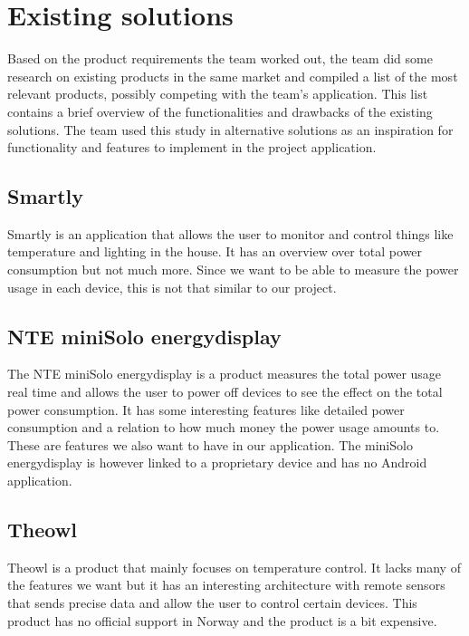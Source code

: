 \section{Existing solutions}

Based on the product requirements the team worked out, the team did some research on existing products in the 
same market and compiled a list of the most relevant products, possibly competing with the team's application. 
This list contains a brief overview of the functionalities and drawbacks of the existing solutions. 
The team used this study in alternative solutions as an inspiration for functionality and features to implement 
in the project application.

\subsection{Smartly}

Smartly\cite{smartly} is an application that allows the user to monitor and control things like 
temperature and lighting in the house. It has an overview over total power consumption but not much more. 
Since we want to be able to measure the power usage in each device, this is not that similar to our project. 


\subsection{NTE miniSolo energydisplay}

The NTE miniSolo energydisplay\cite{nte} is a product measures the total power usage real time and allows 
the user to power off devices to see the effect on the total power consumption. 
It has some interesting features like detailed power consumption and a relation to how much money the power 
usage amounts to. These are features we also want to have in our application. The miniSolo energydisplay is 
however linked to a proprietary device and has no Android application.



\subsection{Theowl}

Theowl\cite{theowl} is a product that mainly focuses on temperature control. 
It lacks many of the features we want but it has an interesting architecture with remote sensors that 
sends precise data and allow the user to control certain devices. This product has no official support in
Norway and the product is a bit expensive.



